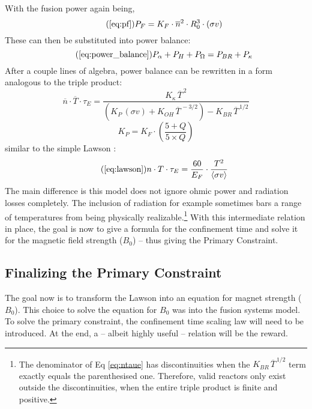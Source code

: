 With the fusion power again being,
\begin{equation}
	\tag{\ref{eq:pf}}
	P_F = K_F \cdot \overline{n}^2 \cdot R_0^3  \cdot (\sigma v)
\end{equation}
These can then be substituted into power balance:
\begin{equation}
	\tag{\ref{eq:power_balance}}
	P_\alpha + P_H + P_\Omega = P_{BR} + P_\kappa
\end{equation}
After a couple lines of algebra, power balance can be rewritten in a form analogous to the triple product:
\begin{equation}
	\label{eq:ntaue}
	 \overline{n}  \cdot \overline{T} \cdot \tau_E = \frac{ K_\kappa \, \overline{T}^{\,2} }{ \left( K_P \, (\sigma v) +  K_{OH} \, \overline{T}^{  \,-3/2 } \right) - K_{BR} \, \overline{T}^{  \,1/2 } }
\end{equation}
\begin{equation}
	K_P = K_F \cdot \left( \frac{5 + Q}{5 \times Q} \right)
\end{equation}
 similar to the simple Lawson :
\begin{equation}
	\tag{\ref{eq:lawson}}
	n \cdot T \cdot \tau_E = \frac{ 60 }{ E_F } \cdot \frac{ T ^ 2 }{ \langle \sigma v \rangle }
\end{equation} 
The main difference is this model does not ignore ohmic power and radiation losses completely. The inclusion of radiation for example sometimes bars a range of temperatures from being physically realizable.\footnote{ The denominator of Eq \ref{eq:ntaue} has discontinuities when the $K_{BR} \, \overline{T}^{  \,1/2 }$ term exactly equals the parenthesised one. Therefore, valid reactors only exist outside the discontinuities, when the entire triple product is finite and positive. } With this intermediate relation in place, the goal is now to give a formula for the confinement time and solve it for the magnetic field strength ($B_0$) -- thus giving the Primary Constraint.

\subsection{Finalizing the Primary Constraint}

The goal now is to transform the Lawson  into an equation for magnet strength ($B_0$). This choice to solve the equation for $B_0$ was  into the fusion systems model. To solve the primary constraint, the confinement time scaling law will need to be introduced. At the end, a  -- albeit highly useful -- relation will be the reward.

